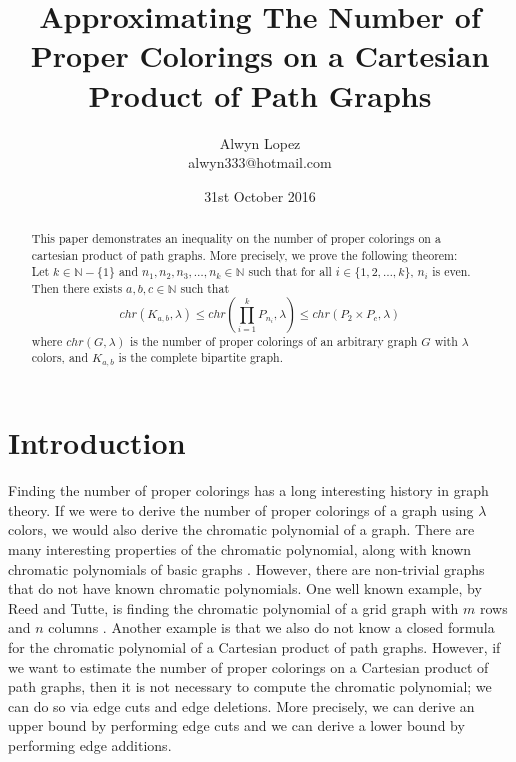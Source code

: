 \documentclass[11pt]{article}
\theoremstyle{definition}
\newcommand{\N}{{\mathbb{N}}}
\begin{document}

\title{Approximating The Number of Proper Colorings on a Cartesian Product of Path Graphs}

\author{Alwyn Lopez\\alwyn333@hotmail.com}

\date{31st October 2016}
\maketitle

\begin{abstract}

This paper demonstrates an inequality on the number of proper colorings on a cartesian product of path graphs. More precisely, we prove the following theorem: \\

\noindent Let $k \in \N - \{1\}$ and $n_1, n_2, n_3, \ldots, n_k \in \N$ such that for all $i \in \{1, 2, \ldots, k\}$, $n_i$ is even. Then there exists $a,b,c \in \N$ such that
\begin{equation}
chr(K_{a,b},\lambda) \leq chr(\prod_{i = 1}^{k}P_{n_{i}}, \lambda) \leq chr(P_{2} \times P_{c}, \lambda) \nonumber
\end{equation} where $chr(G,\lambda)$ is the number of proper colorings of an arbitrary graph $G$ with $\lambda$ colors, and $K_{a,b}$ is the complete bipartite graph. 
\end{abstract}

\section{Introduction}
\label{sec:intro}

Finding the number of proper colorings has a long interesting history in graph theory. If we were to derive the number of proper colorings of a graph using $\lambda$ colors, we would also derive the chromatic polynomial of a graph. There are many interesting properties of the chromatic polynomial, along with known chromatic polynomials of basic graphs \cite{Tam09}. However, there are non-trivial graphs that do not have known chromatic polynomials. One well known example, by Reed and Tutte, is finding the chromatic polynomial of a grid graph with $m$ rows and $n$ columns \cite{Tut88}. Another example is that we also do not know a closed formula for the chromatic polynomial of a Cartesian product of path graphs. However, if we want to estimate the number of proper colorings on a Cartesian product of path graphs, then it is not necessary to compute the chromatic polynomial; we can do so via edge cuts and edge deletions. More precisely, we can derive an upper bound by performing edge cuts and we can derive a lower bound by performing edge additions. 
\end{document}
